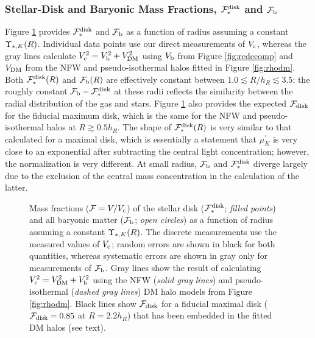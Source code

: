 \documentclass[apj,iop,numberedappendix]{emulateapj}
\begin{document}
\subsubsection{Stellar-Disk and Baryonic Mass Fractions, $\mathcal{F}_{\ast}^{\rm disk}$ and $\mathcal{F}_{\rm b}$}
\label{sec:fdisk}

Figure \ref{fig:fdisk} provides $\mathcal{F}_{\ast}^{\rm disk}$ and $\mathcal{F}_{\rm b}$ as a function of radius
assuming a constant $\Upsilon_{\ast,K}(R)$.  Individual data points use our direct
measurements of $V_{\rm c}$, whereas the gray lines calculate $V_{\rm c}^2 =
V_{\rm b}^2+V_{\rm DM}^2$ using $V_{\rm b}$ from Figure \ref{fig:rcdecomp} and $V_{\rm DM}$ from
the NFW and pseudo-isothermal halos fitted in Figure \ref{fig:rhodm}.  Both
$\mathcal{F}_{\ast}^{\rm disk}(R)$ and $\mathcal{F}_{\rm b}(R)$ are effectively constant between $1.0 \lesssim R/h_R
\lesssim 3.5$; the roughly constant $\mathcal{F}_{\rm b}-\mathcal{F}_{\ast}^{\rm disk}$ at these radii reflects the
similarity between the radial distribution of the gas and stars.  Figure
\ref{fig:fdisk} also provides the expected $\mathcal{F}_{\rm disk}$ for the fiducial maximum disk,
which is the same for the NFW and pseudo-isothermal halos at $R \gtrsim 0.5
h_R$.  The shape of $\mathcal{F}_{\ast}^{\rm disk}(R)$ is very similar to that calculated for a maximal
disk, which is essentially a statement that $\mu^{\prime}_K$ is very close to an
exponential after subtracting the central light concentration; however, the
normalization is very different.  At small radius, $\mathcal{F}_{\rm b}$ and $\mathcal{F}_{\ast}^{\rm disk}$ diverge
largely due to the exclusion of the central mass concentration in the
calculation of the latter.

\begin{figure}
\caption{
%
Mass fractions ($\mathcal{F} = V/V_{\rm c}$) of the stellar disk ($\mathcal{F}_{\ast}^{\rm disk}$; {\it
filled points}) and all baryonic matter ($\mathcal{F}_{\rm b}$; {\it open circles}) as a
function of radius assuming a constant $\Upsilon_{\ast,K}(R)$.  The discrete measurements
use the measured values of $V_{\rm c}$; random errors are shown in black for both
quantities, whereas systematic errors are shown in gray only for measurements of
$\mathcal{F}_{\rm b}$.  Gray lines show the result of calculating $V_{\rm c}^2 = V_{\rm DM}^2+V_{\rm b}^2$
using the NFW ({\it solid gray lines}) and pseudo-isothermal ({\it dashed gray
lines}) DM halo models from Figure \ref{fig:rhodm}.  Black lines show $\mathcal{F}_{\rm disk}$ for
a fiducial maximal disk ($\mathcal{F}_{\rm disk} = 0.85$ at $R=2.2 h_R$) that has been embedded
in the fitted DM halos (see text).
%
}
\label{fig:fdisk}
\end{figure}
\end{document}
